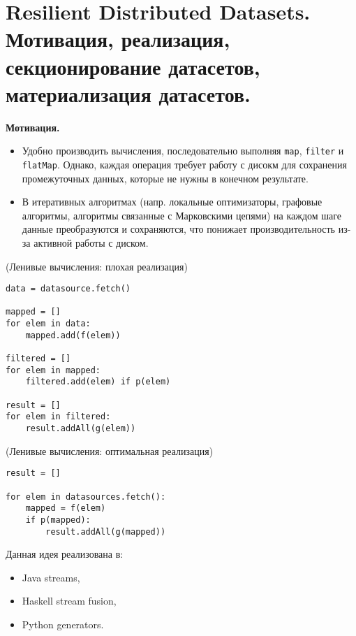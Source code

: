 \section{Resilient Distributed Datasets. Мотивация, реализация,
  секционирование датасетов, материализация датасетов.}

\textbf{Мотивация.}
\begin{itemize}
  \item Удобно производить вычисления, последовательно выполняя \texttt{map},
    \texttt{filter} и \texttt{flatMap}. Однако, каждая операция требует работу с
    дисокм для сохранения промежуточных данных, которые не нужны в конечном
    результате.
  \item В итеративных алгоритмах (напр. локальные оптимизаторы, графовые
    алгоритмы, алгоритмы связанные с Марковскими цепями) на каждом шаге данные
    преобразуются и сохраняются, что понижает производительность из-за активной
    работы с диском.
\end{itemize}


\begin{example}(Ленивые вычисления: плохая реализация)
  \begin{lstlisting}
data = datasource.fetch()

mapped = []
for elem in data:
    mapped.add(f(elem))

filtered = []
for elem in mapped:
    filtered.add(elem) if p(elem)

result = []
for elem in filtered:
    result.addAll(g(elem))
  \end{lstlisting}
\end{example}

\begin{example}(Ленивые вычисления: оптимальная реализация)
  \begin{lstlisting}
result = []

for elem in datasources.fetch():
    mapped = f(elem)
    if p(mapped):
        result.addAll(g(mapped))
  \end{lstlisting}
\end{example}

\begin{remark} Данная идея реализована в:
  \begin{itemize}
    \item Java streams,
    \item Haskell stream fusion,
    \item Python generators.
  \end{itemize}
\end{remark}


